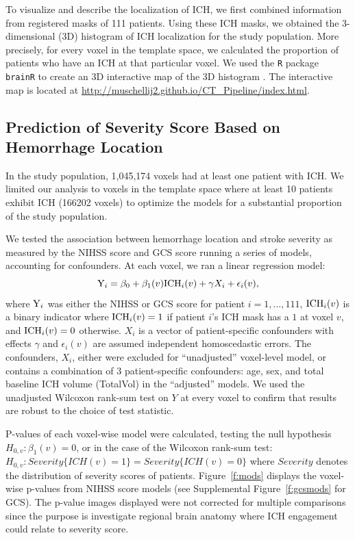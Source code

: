 \documentclass[10pt]{article}\usepackage[]{graphicx}\usepackage[]{color}
\begin{document}
To visualize and describe the localization of ICH, we first combined information from registered masks of 111 patients.  Using these ICH masks, we obtained the $3$-dimensional (3D) histogram of ICH localization for the study population. More precisely, for every voxel in the template space, we calculated the proportion of patients who have an ICH at that particular voxel.  
We used the \verb|R| package \verb|brainR| to create an 3D interactive map of the 3D histogram \citep{brainr}.  The interactive map is located at \url{http://muschellij2.github.io/CT_Pipeline/index.html}.  

\subsection{Prediction of Severity Score Based on Hemorrhage Location}


  

In the study population, 1,045,174 voxels had at least one patient with ICH.  We limited our analysis to voxels in the template space where at least 10 patients exhibit ICH (166202 voxels) to optimize the models for a substantial proportion of the study population.

We tested the association between hemorrhage location and stroke severity as measured by the NIHSS score and GCS score running a series of models, accounting for confounders.  At each voxel, we ran a linear regression model:
\begin{equation}\label{eq:nihss_regression}
{\rm Y}_i=\beta_0+\beta_1(v) {\rm ICH}_i(v)+ \gamma X_i + \epsilon_{i}(v), 
\end{equation}
where ${\rm Y}_i$ was either the NIHSS or GCS score for patient $i=1,\ldots,111$, ${\rm ICH}_i(v)$ is a binary indicator where ${\rm ICH}_i(v) = 1$ if patient $i$'s ICH mask has a $1$ at voxel $v$, and ${\rm ICH}_i(v) = 0$ otherwise. $X_i$ is a vector of patient-specific confounders with effects $\gamma$ and $\epsilon_{i}(v)$ are assumed independent homoscedastic errors.  The confounders, $X_i$, either were excluded for ``unadjusted'' voxel-level model, or contains a combination of $3$ patient-specific confounders: age, sex, and total baseline ICH volume (TotalVol) in the ``adjusted'' models.  We used the unadjusted Wilcoxon rank-sum test on $Y$ at every voxel to confirm that results are robust to the choice of test statistic.


P-values of each voxel-wise model were calculated, testing the null hypothesis $H_{0,v}:\beta_1(v)=0$, or in the case of the Wilcoxon rank-sum test: $H_{0,v}: Severity\{ICH(v) = 1\} = Severity\{ICH(v) = 0\}$ where $Severity$ denotes the distribution of severity scores of patients.  Figure~\ref{f:mods} displays the voxel-wise p-values from NIHSS score models (see Supplemental Figure~\ref{f:gcsmods} for GCS).  The p-value images displayed were not corrected for multiple comparisons since the purpose is investigate regional brain anatomy where ICH engagement could relate to severity score.
\end{document}
